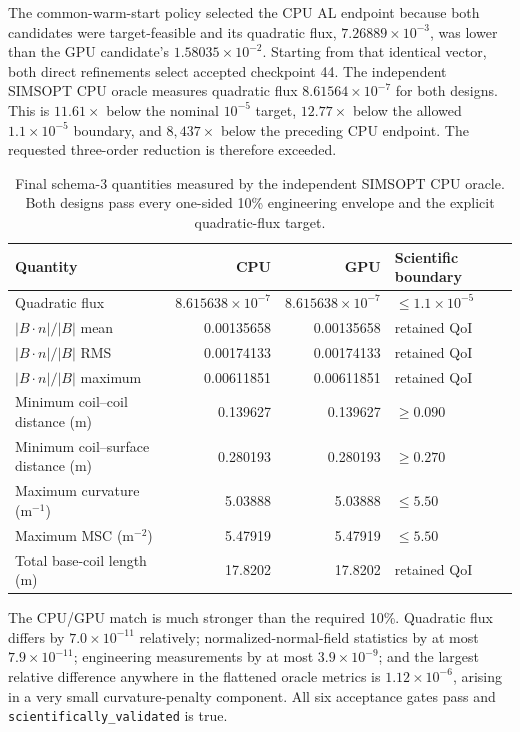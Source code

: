 \documentclass[11pt,a4paper]{article}
\newcommand{\code}[1]{\texttt{#1}}
\begin{document}
The common-warm-start policy selected the CPU AL endpoint because both
candidates were target-feasible and its quadratic flux,
$7.26889\times10^{-3}$, was lower than the GPU candidate's
$1.58035\times10^{-2}$.  Starting from that identical vector, both direct
refinements select accepted checkpoint 44.  The independent SIMSOPT CPU oracle
measures quadratic flux $8.61564\times10^{-7}$ for both designs.  This is
$11.61\times$ below the nominal $10^{-5}$ target, $12.77\times$ below the
allowed $1.1\times10^{-5}$ boundary, and $8{,}437\times$ below the preceding
CPU endpoint.  The requested three-order reduction is therefore exceeded.

\begin{table}[htbp]
\centering
\caption{Final schema-3 quantities measured by the independent SIMSOPT CPU
oracle.  Both designs pass every one-sided 10\% engineering envelope and the
explicit quadratic-flux target.}
\label{tab:flux-refinement-result}
\begin{tabular}{lrrl}
\toprule
Quantity & CPU & GPU & Scientific boundary \\
\midrule
Quadratic flux & $8.615638\times10^{-7}$ & $8.615638\times10^{-7}$
  & $\leq1.1\times10^{-5}$ \\
$|B\cdot n|/|B|$ mean & 0.00135658 & 0.00135658 & retained QoI \\
$|B\cdot n|/|B|$ RMS & 0.00174133 & 0.00174133 & retained QoI \\
$|B\cdot n|/|B|$ maximum & 0.00611851 & 0.00611851 & retained QoI \\
Minimum coil--coil distance (m) & 0.139627 & 0.139627 & $\geq0.090$ \\
Minimum coil--surface distance (m) & 0.280193 & 0.280193 & $\geq0.270$ \\
Maximum curvature (m$^{-1}$) & 5.03888 & 5.03888 & $\leq5.50$ \\
Maximum MSC (m$^{-2}$) & 5.47919 & 5.47919 & $\leq5.50$ \\
Total base-coil length (m) & 17.8202 & 17.8202 & retained QoI \\
\bottomrule
\end{tabular}
\end{table}

The CPU/GPU match is much stronger than the required 10\%.  Quadratic flux
differs by $7.0\times10^{-11}$ relatively; normalized-normal-field statistics
by at most $7.9\times10^{-11}$; engineering measurements by at most
$3.9\times10^{-9}$; and the largest relative difference anywhere in the
flattened oracle metrics is $1.12\times10^{-6}$, arising in a very small
curvature-penalty component.  All six acceptance gates pass and
\code{scientifically\_validated} is true.
\end{document}
